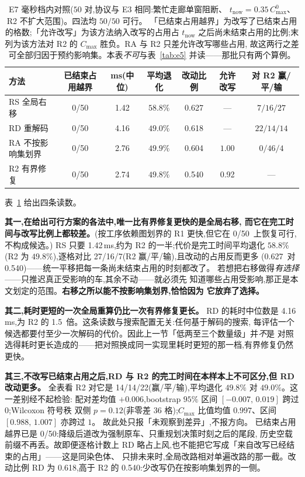 \documentclass[manuscript,screen,review]{acmart}
\newcommand{\NPairs}{50}
\newcommand{\FeasRone}{0/\NPairs}            %
\newcommand{\ClosureAliveFrac}{92\%}
\newcommand{\MsShift}{1.42}          %
\newcommand{\MsRedecode}{4.16}       %
\newcommand{\MsAllFuture}{2.76}      %
\newcommand{\MsCheapRtwo}{2.74}      %
\newcommand{\RedecodeRatio}{1.5}     %
\newcommand{\ShiftBad}{0/\NPairs}    %
\newcommand{\RedecodeBad}{0/\NPairs}
\newcommand{\WinVsShift}{27/16/7}    %
\newcommand{\WinVsRedecode}{14/14/22}
\newcommand{\ResFracCheapRtwo}{0.540}
\newcommand{\ResFracShift}{0.627}
\newcommand{\ResFracRedecode}{0.618}
\newcommand{\ResFracAllFuture}{0.604}
\newcommand{\ClosureShareMean}{0.92} %
\begin{document}
\begin{table}[t]
\centering
\caption{E7 毫秒档内对照(\(\NPairs\) 对,协议与 E3 相同:繁忙走廊单窗阻断、
\(t_{\mathrm{now}}=0.35\,C_{\max}^{0}\)、R2 不扩大范围)。四法均 \(\NPairs/\NPairs\) 可行。
「已结束占用越界」为改写了已结束占用的格数;「允许改写」为该方法纳入改写的占用占 \(t_{\mathrm{now}}\)
之后尚未结束占用的比例;末列为该方法对 R2 的 \(C_{\max}\) 胜负。RA 与 R2 只差允许改写哪些占用,
故这两行之差可全部归因于预约影响集。本表\emph{不可}与表~\ref{tab:e5} 并读——那批只有两个算例。}
\label{tab:cheap}
\small
\begin{tabular}{@{}lcccccc@{}}
\toprule
方法 & 已结束占用越界 & ms(中位) & 平均退化 & 改动比例 & 允许改写 & 对 R2 赢/平/输 \\
\midrule
RS 全局右移      & \ShiftBad     & \MsShift    & \(58.8\%\) & \ResFracShift    & ---   & \(7/16/27\) \\
RD 重解码        & \RedecodeBad  & \MsRedecode & \(49.0\%\) & \ResFracRedecode & ---   & \(22/14/14\) \\
RA 不按影响集划界 & \ShiftBad     & \MsAllFuture & \(49.9\%\) & \ResFracAllFuture & \(1.00\) & \(0/46/4\) \\
R2 有界修复      & \ShiftBad     & \MsCheapRtwo & \(49.8\%\) & \ResFracCheapRtwo & \ClosureShareMean & --- \\
\bottomrule
\end{tabular}
\end{table}

表~\ref{tab:cheap} 给出四条读数。

\textbf{其一,在给出可行方案的各法中,唯一比有界修复更快的是全局右移,
而它在完工时间与改写比例上都较差。}(按工序依赖图划界的 R1 更快,但它在 \FeasRone\ 上恢复可行,
不构成候选。)
RS 只要 \MsShift\,ms,约为 R2 的一半;代价是完工时间平均退化 \(58.8\%\)(R2 为
\(49.8\%\)),逐格对比 \WinVsShift(R2 赢/平/输),且改动的占用反而更多
(\ResFracShift\ 对 \ResFracCheapRtwo)——统一平移把每一条尚未结束占用的时刻都改了。
若想把右移做得\emph{有选择}——只推迟真正受影响的车,其余不动——就必须先
知道哪些占用受影响,那正是本文划定的范围。\textbf{右移之所以能不按影响集划界,恰恰因为
它放弃了选择。}

\textbf{其二,耗时更短的一次全局重算仍比一次有界修复更长。} RD 的耗时中位数是
\MsRedecode\,ms,为 R2 的 \RedecodeRatio\ 倍。这条读数与搜索配置无关:任何基于解码的搜索,
每评估一个候选都要付至少一次解码的代价。因此上一节「低两至三个数量级」并\emph{不}是
对照选得耗时更长造成的——把对照换成同一实现里耗时更短的那一档,有界修复仍然更快。

\textbf{其三,不改写已结束占用之后,RD 与 R2 的完工时间在本样本上不可区分,但 RD 改动更多。}
全表看 R2 对它是 \WinVsRedecode(赢/平/输),平均退化 \(49.8\%\) 对 \(49.0\%\)。这一差别经不起检验:
配对差均值 \(+0.006\),bootstrap \(95\%\) 区间 \([-0.007,\,0.019]\) 跨过 \(0\);Wilcoxon 符号秩
双侧 \(p=0.12\)(非零差 \(36\) 格);\(C_{\max}\) 比值均值 \(0.997\)、区间 \([0.988,\,1.007]\) 亦跨过 \(1\)。
故此处只报「未观察到差异」,不报方向。
已结束占用越界已是 \RedecodeBad:降级后道改为强制原车、只重规划决策时刻之后的尾段,
历史空载前缀不再丢。故即便逐格计数上 RD 略占上风,也不能把它写成「来自改写已经结束的占用」——这是同染色体、
只排未来时,全局改路相对单遍改路的那一截。改动比例 RD 为 \ResFracRedecode,高于 R2 的
\ResFracCheapRtwo:少改写仍在按影响集划界的一侧。
\end{document}

